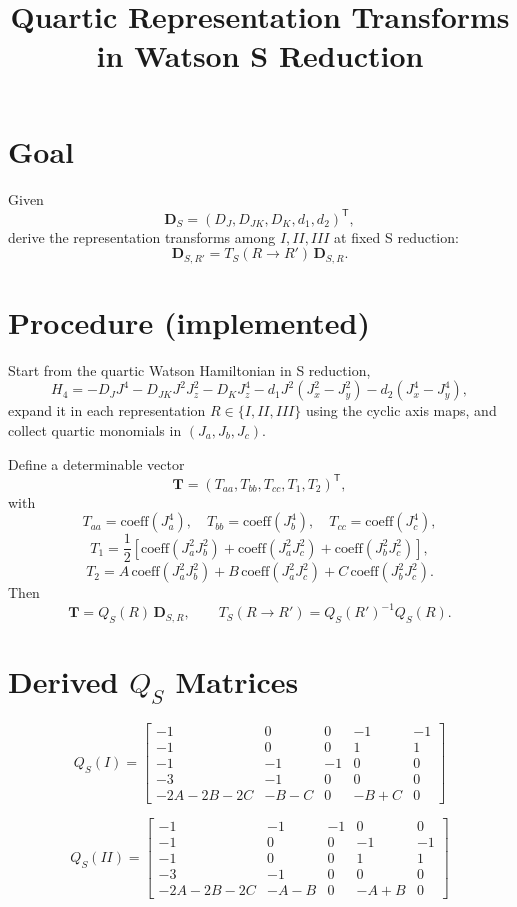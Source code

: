 \documentclass[11pt]{article}
\title{Quartic Representation Transforms in Watson S Reduction}
\author{}
\date{}
\begin{document}
\maketitle

\section*{Goal}
Given
\[
\mathbf D_S=(D_J,D_{JK},D_K,d_1,d_2)^\mathsf T,
\]
derive the representation transforms among $I,II,III$ at fixed S reduction:
\[
\mathbf D_{S,R'} = T_S(R\to R')\,\mathbf D_{S,R}.
\]

\section*{Procedure (implemented)}
Start from the quartic Watson Hamiltonian in S reduction,
\[
H_4=-D_JJ^4-D_{JK}J^2J_z^2-D_KJ_z^4-d_1J^2(J_x^2-J_y^2)-d_2(J_x^4-J_y^4),
\]
expand it in each representation $R\in\{I,II,III\}$ using the cyclic axis maps, and collect quartic monomials in $(J_a,J_b,J_c)$.

Define a determinable vector
\[
\mathbf T=(T_{aa},T_{bb},T_{cc},T_1,T_2)^\mathsf T,
\]
with
\[
T_{aa}=\mathrm{coeff}(J_a^4),\quad
T_{bb}=\mathrm{coeff}(J_b^4),\quad
T_{cc}=\mathrm{coeff}(J_c^4),
\]
\[
T_1=\frac12\left[\mathrm{coeff}(J_a^2J_b^2)+\mathrm{coeff}(J_a^2J_c^2)+\mathrm{coeff}(J_b^2J_c^2)\right],
\]
\[
T_2=A\,\mathrm{coeff}(J_a^2J_b^2)+B\,\mathrm{coeff}(J_a^2J_c^2)+C\,\mathrm{coeff}(J_b^2J_c^2).
\]
Then
\[
\mathbf T = Q_S(R)\,\mathbf D_{S,R},
\qquad
T_S(R\to R') = Q_S(R')^{-1}Q_S(R).
\]

\section*{Derived $Q_S$ Matrices}
\[
Q_S(I)=
\begin{bmatrix}
-1&0&0&-1&-1\\
-1&0&0&1&1\\
-1&-1&-1&0&0\\
-3&-1&0&0&0\\
-2A-2B-2C&-B-C&0&-B+C&0
\end{bmatrix}
\]

\[
Q_S(II)=
\begin{bmatrix}
-1&-1&-1&0&0\\
-1&0&0&-1&-1\\
-1&0&0&1&1\\
-3&-1&0&0&0\\
-2A-2B-2C&-A-B&0&-A+B&0
\end{bmatrix}
\]
\end{document}
